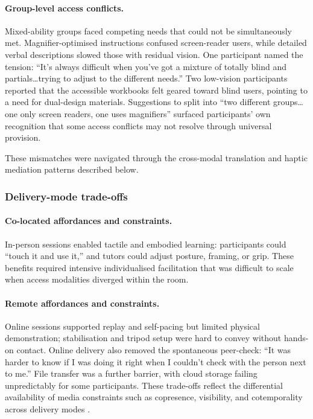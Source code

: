 \paragraph{Group-level access conflicts.}
Mixed-ability groups faced competing needs that could not be simultaneously met. Magnifier-optimised instructions confused screen-reader users, while detailed verbal descriptions slowed those with residual vision. One participant named the tension: ``It's always difficult when you've got a mixture of totally blind and partials\ldots trying to adjust to the different needs.'' Two low-vision participants reported that the accessible workbooks felt geared toward blind users, pointing to a need for dual-design materials. Suggestions to split into ``two different groups\ldots one only screen readers, one uses magnifiers'' surfaced participants' own recognition that some access conflicts may not resolve through universal provision.

These mismatches were navigated through the cross-modal translation and haptic mediation patterns described below.

\subsubsection{Delivery-mode trade-offs}

\paragraph{Co-located affordances and constraints.}
In-person sessions enabled tactile and embodied learning: participants could ``touch it and use it,'' and tutors could adjust posture, framing, or grip. These benefits required intensive individualised facilitation that was difficult to scale when access modalities diverged within the room.

\paragraph{Remote affordances and constraints.}
Online sessions supported replay and self-pacing but limited physical demonstration; stabilisation and tripod setup were hard to convey without hands-on contact. Online delivery also removed the spontaneous peer-check: ``It was harder to know if I was doing it right when I couldn't check with the person next to me.'' File transfer was a further barrier, with cloud storage failing unpredictably for some participants. These trade-offs reflect the differential availability of media constraints such as copresence, visibility, and cotemporality across delivery modes \cite{clark_grounding_1991}.

